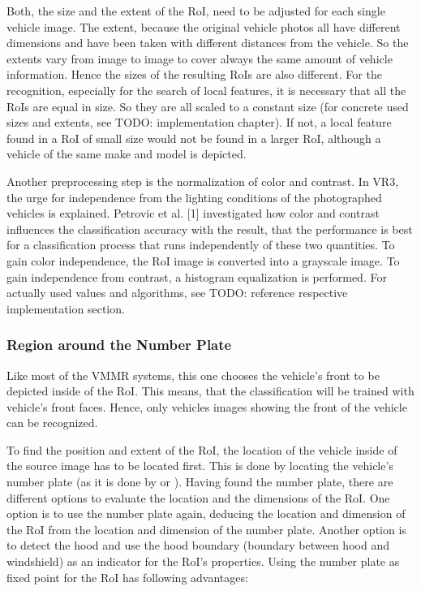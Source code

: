 Both, the size and the extent of the RoI, need to be adjusted for each single vehicle image. The extent, because the original vehicle photos all have different dimensions and have been taken with different distances from the vehicle. So the extents vary from image to image to cover always the same amount of vehicle information. Hence the sizes of the resulting RoIs are also different. For the recognition, especially for the search of local features, it is necessary that all the RoIs are equal in size. So they are all scaled to a constant size (for concrete used sizes and extents, see TODO: implementation chapter). If not, a local feature found in a RoI of small size would not be found in a larger RoI, although a vehicle of the same make and model is depicted.

Another preprocessing step is the normalization of color and contrast. In VR3, the urge for independence from the lighting conditions of the photographed vehicles is explained. Petrovic et al. [1] investigated how color and contrast influences the classification accuracy with the result, that the performance is best for a classification process that runs independently of these two quantities. To gain color independence, the RoI image is converted into a grayscale image. To gain independence from contrast, a histogram equalization is performed. For actually used values and algorithms, see TODO: reference respective implementation section.

\subsubsection{Region around the Number Plate}\label{sec:regionAroundNumberPlate}
Like most of the VMMR systems, this one chooses the vehicle's front to be depicted inside of the RoI. This means, that the classification will be trained with vehicle’s front faces. Hence, only vehicles images showing the front of the vehicle can be recognized.

To find the position and extent of the RoI, the location of the vehicle inside of the source image has to be located first. This is done by locating the vehicle's number plate (as it is done by \citep{petrovic2004analysis} or \citep{siddiqui2015robust}). Having found the number plate, there are different options to evaluate the location and the dimensions of the RoI. One option is to use the number plate again, deducing the location and dimension of the RoI from the location and dimension of the number plate. Another option is to detect the hood and use the hood boundary (boundary between hood and windshield) as an indicator for the RoI’s properties. Using the number plate as fixed point for the RoI has following advantages:

